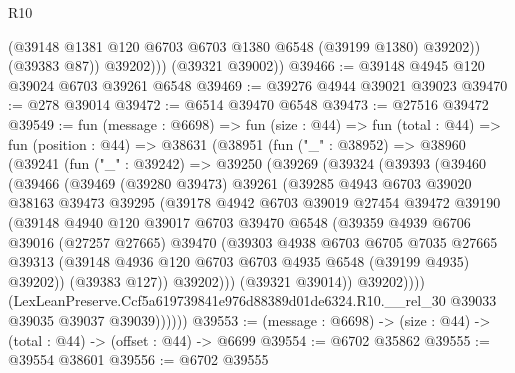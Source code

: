 \begin{lexlean}{R10}
\begin{coremodule}
                (@39148 @1381 @120 @6703 @6703 @1380 @6548 (@39199 @1380) @39202))
              (@39383 @87))
            @39202)))
      (@39321 @39002))
@39466 := @39148 @4945 @120 @39024 @6703 @39261 @6548
@39469 := @39276 @4944 @39021 @39023
@39470 := @278 @39014
@39472 := @6514 @39470 @6548
@39473 := @27516 @39472
@39549 := fun (message : @6698) =>
  fun (size : @44) =>
  fun (total : @44) =>
  fun (position : @44) =>
  @38631
    (@38951
      (fun ("_" : @38952) =>
      @38960
        (@39241
          (fun ("_" : @39242) =>
          @39250
            (@39269
              (@39324
                (@39393
                  (@39460
                    (@39466
                      (@39469
                        (@39280 @39473)
                        @39261
                        (@39285
                          @4943
                          @6703
                          @39020
                          @38163
                          @39473
                          @39295
                          (@39178
                            @4942
                            @6703
                            @39019
                            @27454
                            @39472
                            @39190
                            (@39148
                              @4940
                              @120
                              @39017
                              @6703
                              @39470
                              @6548
                              (@39359
                                @4939
                                @6706
                                @39016
                                (@27257 @27665)
                                @39470
                                (@39303
                                  @4938
                                  @6703
                                  @6705
                                  @7035
                                  @27665
                                  @39313
                                  (@39148 @4936 @120 @6703 @6703 @4935 @6548 (@39199 @4935) @39202))
                                (@39383 @127))
                              @39202)))
                        (@39321 @39014))
                      @39202))))
              (LexLeanPreserve.Ccf5a619739841e976d88389d01de6324.R10.__rel_30
                @39033
                @39035
                @39037
                @39039))))))
@39553 := (message : @6698) -> (size : @44) -> (total : @44) -> (offset : @44) -> @6699
@39554 := @6702 @35862
@39555 := @39554 @38601
@39556 := @6702 @39555

\end{coremodule}
\end{lexlean}
